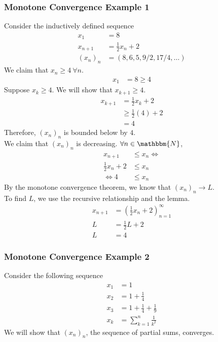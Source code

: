 \documentclass[10pt]{extarticle}
\newcommand{\N}{\mathbbm{N}}
\begin{document}
    \subsubsection{Monotone Convergence Example 1}%
    Consider the inductively defined sequence
    \begin{align*}
      x_{1} &= 8\\
      x_{n+1} &= \frac{1}{2}x_n + 2\\
      (x_n)_n &= (8,6,5,9/2,17/4,\dots)
    \end{align*}
    We claim that $x_n \geq 4~\forall n$.
    \begin{align*}
      x_1 &= 8 \geq 4
    \end{align*}
    Suppose $x_k \geq 4$. We will show that $x_{k+1} \geq 4$.
    \begin{align*}
      x_{k + 1} &= \frac{1}{2}x_k + 2\\
                &\geq \frac{1}{2}(4) + 2\\
                &= 4
    \end{align*}
    Therefore, $(x_n)_n$ is bounded below by $4$.\\

    We claim that $(x_n)_n$ is decreasing. $\forall n\in\N$,
    \begin{align*}
      x_{n+1} &\leq x_n
      \Leftrightarrow \\
      \frac{1}{2}x_n + 2 &\leq x_n\\
      \Leftrightarrow
      4 &\leq x_n
    \end{align*}
    By the monotone convergence theorem, we know that $(x_n)_n\rightarrow L$.\\

    To find $L$, we use the recursive relationship and the lemma.
    \begin{align*}
      x_{n+1} &= \left(\frac{1}{2}x_n + 2\right)_{n=1}^{\infty}\\
      L &= \frac{1}{2}L + 2\\
      L &= 4
    \end{align*}
    \subsubsection{Monotone Convergence Example 2}%
    Consider the following sequence
    \begin{align*}
      x_1 &= 1\\
      x_2 &= 1 + \frac{1}{4}\\
      x_3 &= 1 + \frac{1}{4} + \frac{1}{9}\\
      x_{k} &= \sum_{k=1}^{n} \frac{1}{k^2}
    \end{align*}
    We will show that $(x_n)_n$, the sequence of partial sums, converges.\\
\end{document}
